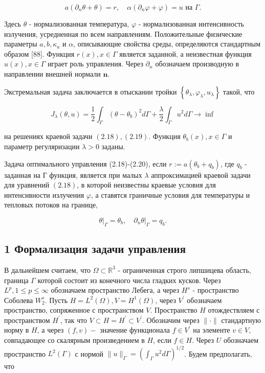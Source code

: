 \documentclass[10pt]{article}
\begin{document}
$$
a\left(\partial_{n} \theta+\theta\right)=r, \quad \alpha\left(\partial_{n} \varphi+\varphi\right)=u \text { на } \Gamma .
$$

Здесь $\theta$ - нормализованная температура, $\varphi$ - нормализованная интенсивность излучения, усредненная по всем направлениям. Положительные физические параметры $a, b, \kappa_{a}$ и $\alpha$, описывающие свойства среды, определяются стандартным образом [88]. Функция $r(x), x \in \Gamma$ является заданной, а неизвестная функция $u(x), x \in \Gamma$ играет роль управления. Через $\partial_{n}$ обозначаем производную в направлении внешней нормали $\mathbf{n}$.

Экстремальная задача заключается в отыскании тройки $\left\{\theta_{\lambda}, \varphi_{\lambda}, u_{\lambda}\right\}$ такой, что

$$
J_{\lambda}(\theta, u)=\frac{1}{2} \int_{\Gamma}\left(\theta-\theta_{b}\right)^{2} d \Gamma+\frac{\lambda}{2} \int_{\Gamma} u^{2} d \Gamma \rightarrow \inf
$$

на решениях краевой задачи $(2.18),(2.19)$. Функция $\theta_{b}(x), x \in \Gamma$ и параметр регуляризации $\lambda>0$ заданы.

Задача оптимального управления (2.18)-(2.20), если $r:=a\left(\theta_{b}+q_{b}\right)$, где $q_{b}$ - заданная на $Г$ функция, является при малых $\lambda$ аппроксимацией краевой задачи для уравнений $(2.18)$, в которой неизвестны краевые условия для интенсивности излучения $\varphi$, а ставятся граничные условия для температуры и тепловых потоков на границе,

$$
\left.\theta\right|_{\Gamma}=\theta_{b},\left.\quad \partial_{n} \theta\right|_{\Gamma}=q_{b} .
$$

\subsection{1 Формализация задачи управления}
В дальнейшем считаем, что $\Omega \subset \mathbb{R}^{3}$ - ограниченная строго липшицева область, граница $\Gamma$ которой состоит из конечного числа гладких кусков. Через $L^{p}, 1 \leqslant p \leqslant \infty$ обозначаем пространство Лебега, а через $H^{s}$ - пространство Соболева $W_{2}^{s}$. Пусть $H=L^{2}(\Omega), V=H^{1}(\Omega)$, через $V^{\prime}$ обозначаем пространство, сопряженное с пространством $V$. Пространство $H$ отождествляем с пространством $H^{\prime}$, так что $V \subset H=H^{\prime} \subset V^{\prime}$. Обозначим через $\|\cdot\|$ стандартную норму в $H$, а через $(f, v)-$ значение функционала $f \in V^{\prime}$ на элементе $v \in V$, совпадающее со скалярным произведением в $H$, если $f \in H$. Через $U$ обозначаем пространство $L^{2}(\Gamma)$ с нормой $\|u\|_{\Gamma}=\left(\int_{\Gamma} u^{2} d \Gamma\right)^{1 / 2}$. Будем предполагать, что
\end{document}
